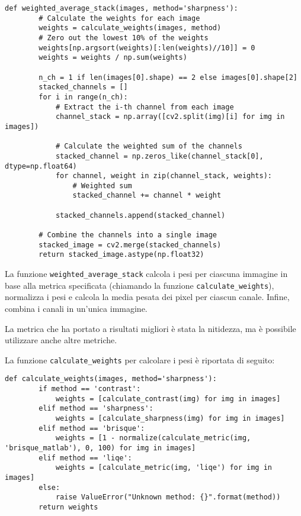 \begin{lstlisting}[label={lst:weighted_average_stack}]
    def weighted_average_stack(images, method='sharpness'):
        # Calculate the weights for each image
        weights = calculate_weights(images, method)
        # Zero out the lowest 10% of the weights
        weights[np.argsort(weights)[:len(weights)//10]] = 0
        weights = weights / np.sum(weights)

        n_ch = 1 if len(images[0].shape) == 2 else images[0].shape[2]
        stacked_channels = []
        for i in range(n_ch):
            # Extract the i-th channel from each image
            channel_stack = np.array([cv2.split(img)[i] for img in images])

            # Calculate the weighted sum of the channels
            stacked_channel = np.zeros_like(channel_stack[0], dtype=np.float64)
            for channel, weight in zip(channel_stack, weights):
                # Weighted sum
                stacked_channel += channel * weight

            stacked_channels.append(stacked_channel)

        # Combine the channels into a single image
        stacked_image = cv2.merge(stacked_channels)
        return stacked_image.astype(np.float32)
\end{lstlisting}

La funzione \texttt{weighted\_average\_stack} calcola i pesi per ciascuna immagine in base alla metrica specificata (chiamando la funzione \texttt{calculate\_weights}), normalizza i pesi e calcola la media pesata dei pixel per ciascun canale. Infine, combina i canali in un'unica immagine.

La metrica che ha portato a risultati migliori è stata la nitidezza, ma è possibile utilizzare anche altre metriche.

La funzione \texttt{calculate\_weights} per calcolare i pesi è riportata di seguito:

\begin{lstlisting}[label={lst:calculate_weights}]
    def calculate_weights(images, method='sharpness'):
        if method == 'contrast':
            weights = [calculate_contrast(img) for img in images]
        elif method == 'sharpness':
            weights = [calculate_sharpness(img) for img in images]
        elif method == 'brisque':
            weights = [1 - normalize(calculate_metric(img, 'brisque_matlab'), 0, 100) for img in images]
        elif method == 'liqe':
            weights = [calculate_metric(img, 'liqe') for img in images]
        else:
            raise ValueError("Unknown method: {}".format(method))
        return weights 
\end{lstlisting}

